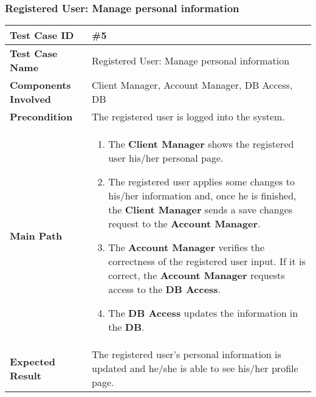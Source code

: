 \subsubsection{Registered User: Manage personal information}
\begin{center}
	\begin{tabular} { | m{4.5cm} | m{8.5cm} | }
		\hline
		\textbf{Test Case ID} & \#5\\
		\hline
		\textbf{Test Case Name} & Registered User: Manage personal information\\
		\hline
		\textbf{Components Involved} & Client Manager, Account Manager, DB Access, DB\\
		\hline
		\textbf{Precondition} & The registered user is logged into the system.\\
		\hline 
		\textbf{Main Path} & 
		\begin{enumerate}
			\item The \textbf{Client Manager} shows the registered user his/her personal page.
			\item The registered user applies some changes to his/her information and, once he is finished, the \textbf{Client Manager} sends a save changes request to the \textbf{Account Manager}.
			\item The \textbf{Account Manager} verifies the correctness of the registered user input. If it is correct, the \textbf{Account Manager} requests access to the \textbf{DB Access}.
			\item The \textbf{DB Access} updates the information in the \textbf{DB}.
		\end{enumerate}\\
		\hline
		\textbf{Expected Result} & The registered user's personal information is updated and he/she is able to see his/her profile page.\\
		\hline
	\end{tabular}
\end{center}
\newpage
